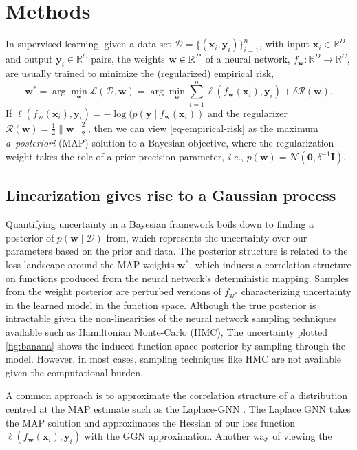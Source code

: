 \documentclass{article}
\makeatletter
\newcommand{\ie}{\textit{i.e.\@}\xspace}
\newcommand{\dataset}{\ensuremath{\mathcal{D}}}
\newcommand{\inputDomain}{\ensuremath{\mathbb{R}^{D}}}
\newcommand{\outputDomain}{\ensuremath{\mathbb{R}^{C}}}
\newcommand{\weights}{\ensuremath{\mathbf{w}}}
\newcommand{\mbf}[1]{\mathbf{#1}}
\newcommand{\MI}{\mbf{I}}
\newcommand{\vzeros}{\mbf{0}}
\newcommand{\vw}{\mbf{w}}
\newcommand{\Norm}{\mathcal{N}}
\makeatother
\begin{document}
\section{Methods}
\label{sec:methods}
%
In supervised learning, given a data set $\dataset = \{(\mathbf{x}_{i} , \mathbf{y}_{i})\}_{i=1}^{n}$, with input $\mathbf{x}_i \in \inputDomain$ and output $\mathbf{y}_i \in \outputDomain$ pairs, the weights $\weights \in \R^{P}$ of a neural network, $f_\mathbf{w} : \inputDomain \to \outputDomain$, are usually trained to minimize the (regularized) empirical risk,
%
\begin{equation} \label{eq-empirical-risk}
  \weights^{*} = 
  \arg \min_{\weights} \mathcal{L}(\dataset,\weights) =
  \arg \min_{\weights} \sum_{i=1}^{n} \ell(f_\weights(\mathbf{x}_{i}), \mathbf{y}_i) + \delta \mathcal{R}(\weights).
\end{equation}
%
If $\ell(f_\weights(\mathbf{x}_{i}), \mathbf{y}_i) = -\log(p(\mathbf{y} \mid f_\weights(\mathbf{x}_{i}))$ and the regularizer $\mathcal{R}(\weights) = \frac{1}{2}\|\weights\|^{2}_2$, then we can view \cref{eq-empirical-risk} as the maximum {\it a~posteriori} (MAP) solution to a Bayesian objective, where the regularization weight takes the role of a prior precision parameter, \ie, $p(\vw) = \Norm(\vzeros, \delta^{-1} \MI)$.

%
\subsection{Linearization gives rise to a Gaussian process} 
\label{sec:nn2gp}
%
Quantifying uncertainty in a Bayesian framework boils down to finding a posterior of $p(\vw \mid \dataset)$ from, which represents the uncertainty over our parameters based on the prior and data. The posterior structure is related to the loss-landscape around the MAP weights $\vw^*$, which induces a correlation structure on functions produced from the neural network's deterministic mapping. Samples from the weight posterior are perturbed versions of $f_{\vw^*}$ characterizing uncertainty in the learned model in the function space. Although the true posterior is intractable given the non-linearities of the neural network sampling techniques available such as Hamiltonian Monte-Carlo (HMC), The uncertainty plotted \cref{fig:banana} shows the induced function space posterior by sampling through the model. However, in most cases, sampling techniques like HMC are not available given the computational burden.

A common approach is to approximate the correlation structure of a distribution centred at the MAP estimate such as the Laplace-GNN \citep{khan2019approximate, daxberger2021laplace, maddox2021fast}. The Laplace GNN takes the MAP solution and approximates the Hessian of our loss function  $\ell(f_\weights(\mathbf{x}_{i}), \mathbf{y}_i)$ with the GGN approximation. Another way of viewing the 
\end{document}
